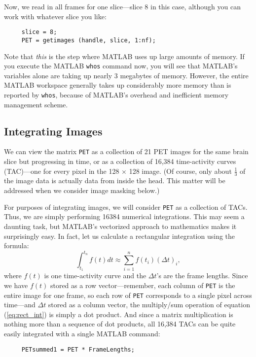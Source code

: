 \documentclass[11pt]{article}
\begin{document}
Now, we read in all frames for one slice---slice 8 in this case,
although you can work with whatever slice you like:
\begin{verbatim}
     slice = 8;
     PET = getimages (handle, slice, 1:nf);
\end{verbatim}
Note that {\em this} is the step where MATLAB uses up large amounts of
memory.  If you execute the MATLAB \verb|whos| command now, you will
see that MATLAB's variables alone are taking up nearly 3 megabytes of
memory.  However, the entire MATLAB workspace generally takes up
considerably more memory than is reported by \verb|whos|, because of
MATLAB's overhead and inefficient memory management scheme.

\subsection{Integrating Images}

We can view the matrix \verb|PET| as a collection of 21 PET images
for the same brain slice but progressing in time, or as a collection
of 16,384 time-activity curves (TAC)---one for every pixel in the 128
$\times$ 128 image.  (Of course, only about $\frac{1}{3}$ of the
image data is actually data from inside the head.  This matter will
be addressed when we consider image masking below.)

For purposes of integrating images, we will consider \verb|PET| as a
collection of TACs.  Thus, we are simply performing 16384 numerical
integrations.  This may seem a daunting task, but MATLAB's vectorized
approach to mathematics makes it surprisingly easy.  In fact, let us
calculate a rectangular integration using the formula:
\begin{equation}
\int_{t_{1}}^{t_{n}} f(t) dt \approx \sum_{i=1}^{n} f(t_{i}) (\Delta t)_{i},
\label{eq:rect_int}
\end{equation}
where $f(t)$ is one time-activity curve and the $\Delta t$'s are the
frame lengths.  Since we have $f(t)$ stored as a row
vector---remember, each column of \verb|PET| is the entire image for
one frame, so each row of \verb|PET| corresponds to a single pixel
across time---and $\Delta t$ stored as a column vector, the
multiply/sum operation of equation (\ref{eq:rect_int}) is simply a
dot product.  And since a matrix multiplication is nothing more than
a sequence of dot products, all 16,384 TACs can be quite easily
integrated with a single MATLAB command:
\begin{verbatim}
     PETsummed1 = PET * FrameLengths;
\end{verbatim}
\end{document}
